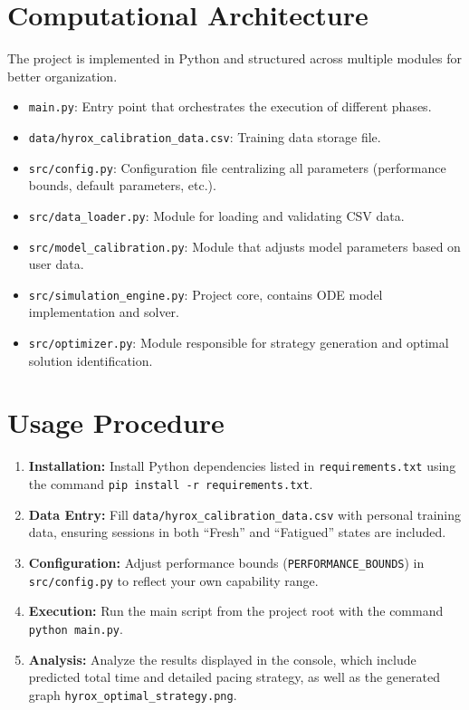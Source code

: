 \documentclass[11pt, a4paper]{article}
\begin{document}
	\section{Computational Architecture}
	The project is implemented in Python and structured across multiple modules for better organization.
	\begin{itemize}
		\item \texttt{main.py}: Entry point that orchestrates the execution of different phases.
		\item \texttt{data/hyrox\_calibration\_data.csv}: Training data storage file.
		\item \texttt{src/config.py}: Configuration file centralizing all parameters (performance bounds, default parameters, etc.).
		\item \texttt{src/data\_loader.py}: Module for loading and validating CSV data.
		\item \texttt{src/model\_calibration.py}: Module that adjusts model parameters based on user data.
		\item \texttt{src/simulation\_engine.py}: Project core, contains ODE model implementation and solver.
		\item \texttt{src/optimizer.py}: Module responsible for strategy generation and optimal solution identification.
	\end{itemize}
	
	\section{Usage Procedure}
	\begin{enumerate}
		\item \textbf{Installation:} Install Python dependencies listed in \texttt{requirements.txt} using the command \texttt{pip install -r requirements.txt}.
		\item \textbf{Data Entry:} Fill \texttt{data/hyrox\_calibration\_data.csv} with personal training data, ensuring sessions in both ``Fresh'' and ``Fatigued'' states are included.
		\item \textbf{Configuration:} Adjust performance bounds (\texttt{PERFORMANCE\_BOUNDS}) in \texttt{src/config.py} to reflect your own capability range.
		\item \textbf{Execution:} Run the main script from the project root with the command \texttt{python main.py}.
		\item \textbf{Analysis:} Analyze the results displayed in the console, which include predicted total time and detailed pacing strategy, as well as the generated graph \texttt{hyrox\_optimal\_strategy.png}.
	\end{enumerate}
	
\end{document}
